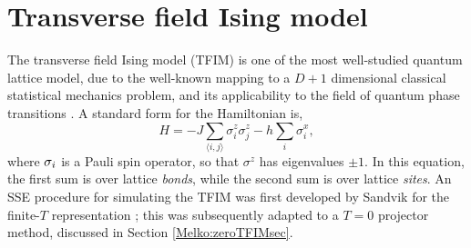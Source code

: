 \documentclass[vecphys]{svmult}
\begin{document}
\section{Transverse field Ising model} \label{Melko:TFIMSec}

The transverse field Ising model (TFIM) is one of the most well-studied quantum lattice model, due to the well-known mapping to a $D+1$ dimensional classical statistical mechanics problem, and its applicability to the field of quantum phase transitions \cite{Melko:Sachdev11}.  A standard form for the Hamiltonian is,
\begin{equation}
H = -J\sum_{\langle i,j \rangle} \sigma^z_i \sigma^z_j - h \sum_{i} \sigma^x_i,
\end{equation}
where ${\bf \sigma}_i$ is a Pauli spin operator, so that $\sigma^z$ has eigenvalues $\pm 1$.  In this equation, the first sum is over lattice {\em bonds}, while the second sum is over lattice {\em sites}.  An SSE procedure for simulating the TFIM was first developed by Sandvik for the finite-$T$ representation \cite{Melko:Sandvik03}; this was subsequently adapted to a $T=0$ projector method, discussed in Section \ref{Melko:zeroTFIMsec}.
\end{document}
